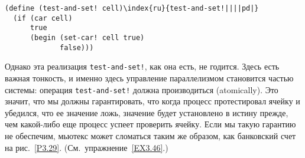 \begin{Verbatim}[fontsize=\small]
(define (test-and-set! cell)\index{ru}{test-and-set!||||pd|}
  (if (car cell)
      true
      (begin (set-car! cell true)
             false)))
\end{Verbatim}


Однако эта реализация {\tt test-and-set!}, как она
есть, не годится.  Здесь есть важная тонкость, и именно здесь
управление параллелизмом становится частью системы: операция
{\tt test-and-set!} должна производиться
 (atomically).  Это значит, что мы должны
гарантировать, что когда процесс протестировал ячейку и убедился, что
ее значение ложь, значение будет установлено в истину прежде, чем
какой-либо еще процесс успеет проверить ячейку.  Если мы такую  гарантию
не обеспечим, мьютекс может сломаться таким же образом, как банковский
счет на рис.~\ref{P3.29}.
(См.~упражнение~\ref{EX3.46}.)

